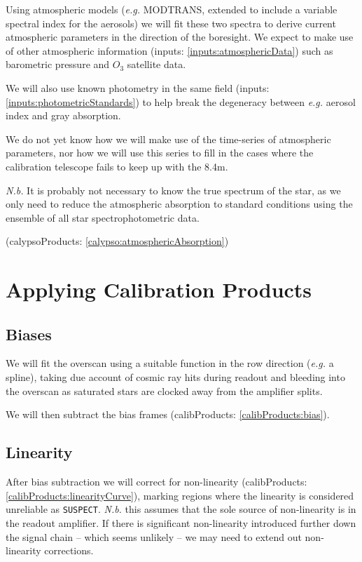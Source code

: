 \documentclass[12pt]{article}
\newcommand{\eg}{\textit{e.g.}\xspace}
\newcommand{\Nb}{\textit{N.b.}\xspace}
\newcommand{\inputData}[1]{(inputs: \ref{inputs:#1})}
\newcommand{\outputData}[1]{(calibProducts: \ref{calibProducts:#1})}
\newcommand{\calypsoData}[1]{(calypsoProducts: \ref{calypso:#1})}
\begin{document}
Using atmospheric models (\eg MODTRANS, extended to include a variable spectral index for the aerosols)
we will fit these two spectra to derive current atmospheric parameters in the direction of the boresight.
We expect to make use of other atmospheric information \inputData{atmosphericData} such as barometric pressure
and $O_3$ satellite data.

We will also use known photometry in the same field \inputData{photometricStandards} to help break the
degeneracy between \eg aerosol index and gray absorption.

We do not yet know how we will make use of the time-series of atmospheric parameters, nor how we will
use this series to fill in the cases where the calibration telescope fails to keep up with the 8.4m.

\Nb It is probably not necessary to know the true spectrum of the star, as we only need to reduce the
atmospheric absorption to standard conditions using the ensemble of all star spectrophotometric data.

\calypsoData{atmosphericAbsorption}

\section{Applying Calibration Products}

\subsection{Biases}

We will fit the overscan using a suitable function in the row direction (\eg a spline), taking
due account of cosmic ray hits during readout and bleeding into the overscan as saturated
stars are clocked away from the amplifier splits.

We will then subtract the bias frames \outputData{bias}.

\subsection{Linearity}

After bias subtraction we will correct for non-linearity \outputData{linearityCurve}, marking
regions where the linearity is considered unreliable as \texttt{SUSPECT}.
\Nb this assumes that the sole
source of non-linearity is in the readout amplifier.  If there is significant non-linearity
introduced further down the signal chain -- which seems unlikely -- we may need to extend
out non-linearity corrections.
\end{document}
